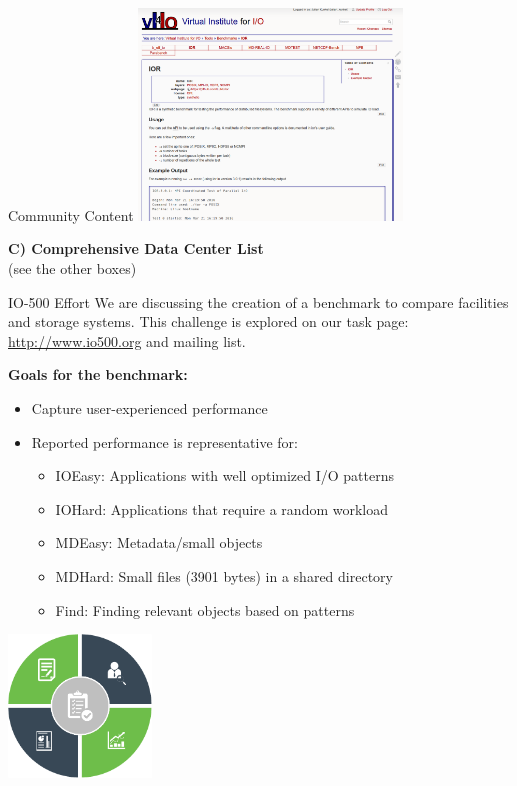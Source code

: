 \documentclass[portrait,a0paper,fontscale=0.4]{baposter}
\begin{document}
\begin{poster}
\begin{posterbox}[name=wps,column=0,below=overview, above=bottom]{Community Content}
\includegraphics[width=7cm]{benchmark}


\textbf{C) Comprehensive Data Center List} \\ (see the other boxes)

\medskip

\end{posterbox}


\begin{posterbox}[name=io500,column=1,span=2]{IO-500 Effort}
We are discussing the creation of a benchmark to compare facilities and storage systems. This challenge is explored on our task page: \url{http://www.io500.org} and mailing list.

\textbf{Goals for the benchmark:}

\begin{minipage}{10.5cm}
\begin{itemize}
\item Capture user-experienced performance %
\item Reported performance is representative for:
\vspace*{-0.5em}
\begin{itemize}
\item IOEasy: Applications with well optimized I/O patterns
\item IOHard: Applications that require a random workload
\item MDEasy: Metadata/small objects
\item MDHard: Small files (3901 bytes) in a shared directory
\item Find: Finding relevant objects based on patterns
\end{itemize}
\end{itemize}
\end{minipage}
\qquad
\begin{minipage}{4cm}
\includegraphics[width=3.8cm]{border}
\end{minipage}



\end{posterbox}
\end{poster}
\end{document}
